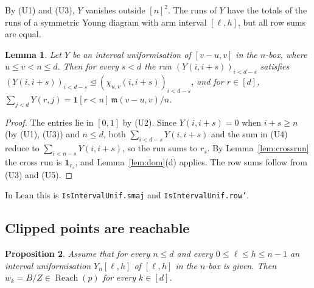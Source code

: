\documentclass[11pt]{amsart}
\newtheorem{lemma}{Lemma}[section]
\newtheorem{proposition}[lemma]{Proposition}
\theoremstyle{definition}
\theoremstyle{remark}
\numberwithin{equation}{section}
\newcommand{\Reach}{\operatorname{Reach}}
\newcommand{\ind}[1]{\mathbf{1}[#1]}
\newcommand{\dom}{\trianglelefteq}
\newcommand{\ms}{\mathfrak{m}}
\newcommand{\lean}[1]{\texttt{#1}}
\begin{document}
By (U1) and (U3), $Y$ vanishes outside $[n]^2$. The runs of $Y$ have the totals of the runs of a
symmetric Young diagram with arm interval $[\ell,h]$, but all row sums are equal.

\begin{lemma}\label{lem:unifdom}
Let $Y$ be an interval uniformisation of $[v-u,v]$ in the $n$-box, where $u\le v<n\le d$. Then for every
$s<d$ the run $(Y(i,i+s))_{i<d-s}$ satisfies $(Y(i,i+s))_{i<d-s}\dom(\chi_{u,v}(i,i+s))_{i<d-s}$, and
for $r\in[d]$, $\sum_{j<d}Y(r,j)=\ind{r<n}\,\ms(v-u,v)/n$.
\end{lemma}

\begin{proof}
The entries lie in $[0,1]$ by (U2). Since $Y(i,i+s)=0$ when $i+s\ge n$ (by (U1), (U3)) and $n\le d$,
both $\sum_{i<d-s}Y(i,i+s)$ and the sum in (U4) reduce to $\sum_{i<n-s}Y(i,i+s)$, so the run sums to
$r_s$. By Lemma~\ref{lem:crossrun} the cross run is $\mathbf 1_{r_s}$, and Lemma~\ref{lem:dom}(d)
applies. The row sums follow from (U3) and (U5).
\end{proof}

In Lean this is \lean{IsIntervalUnif.smaj} and \lean{IsIntervalUnif.row'}.

\subsection{Clipped points are reachable}

\begin{proposition}\label{prop:wk}
Assume that for every $n\le d$ and every $0\le\ell\le h\le n-1$ an interval uniformisation
$Y_n[\ell,h]$ of $[\ell,h]$ in the $n$-box is given. Then $w_k=B/Z\in\Reach(p)$ for every $k\in[d]$.
\end{proposition}
\end{document}
